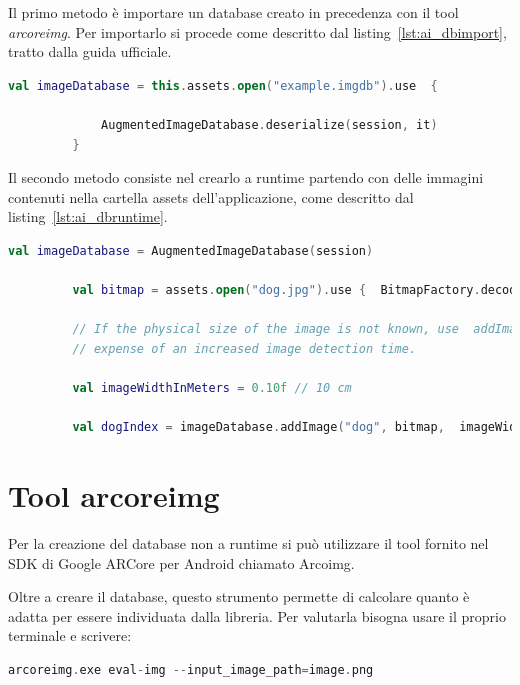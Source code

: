 \documentclass[crop=false, class=book]{standalone}
\begin{document}
	Il primo metodo è importare un database creato in precedenza con il tool \textit{arcoreimg}.
	Per importarlo si procede come descritto dal listing~\vref{lst:ai_dbimport}, tratto dalla guida ufficiale.
	
	\begin{center}
		\begin{minipage}{0.95\textwidth}
		\begin{lstlisting}[caption={Importazione database.}, label={lst:ai_dbimport}, language=Kotlin]
		 val imageDatabase = this.assets.open("example.imgdb").use  {
			
			 AugmentedImageDatabase.deserialize(session, it)
		 }
		\end{lstlisting}
		\end{minipage}
	\end{center}
	
	Il secondo metodo consiste nel crearlo a runtime partendo con delle immagini contenuti nella cartella assets dell’applicazione, come descritto dal listing~\vref{lst:ai_dbruntime}.
	
	\begin{center}
		\begin{minipage}{0.95\textwidth}
		\begin{lstlisting}[caption={Creazione del database.}, label={lst:ai_dbruntime}, language=Kotlin]
		 val imageDatabase = AugmentedImageDatabase(session)
		
		 val bitmap = assets.open("dog.jpg").use {  BitmapFactory.decodeStream(it) }
		
		 // If the physical size of the image is not known, use  addImage(String, Bitmap) instead, at the
		 // expense of an increased image detection time.
		
		 val imageWidthInMeters = 0.10f // 10 cm
		
		 val dogIndex = imageDatabase.addImage("dog", bitmap,  imageWidthInMeters)
		\end{lstlisting}
		\end{minipage}
	\end{center}
	
	\section{Tool arcoreimg}	
	
	Per la creazione del database non a runtime si può utilizzare il tool fornito nel SDK di Google ARCore 	per Android chiamato Arcoimg.
	
	Oltre a creare il database, questo strumento permette di calcolare quanto è adatta per essere individuata dalla libreria.
	Per valutarla bisogna usare il proprio terminale e scrivere:
	\begin{center}
	
	\begin{minipage}{0.95\textwidth}
	\begin{lstlisting}[caption={Valutazione delle immagini}, label={lst:ai_session}, language=Kotlin]
	   arcoreimg.exe eval-img --input_image_path=image.png
	  \end{lstlisting}
	\end{minipage}
	\end{center}
	
\end{document}
